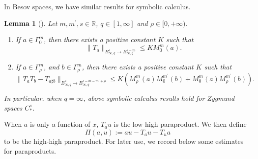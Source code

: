\documentclass[10pt]{amsart}
\newtheorem{lemma}[theorem]{Lemma}
\theoremstyle{remark}
\theoremstyle{definition}
\numberwithin{equation}{section}
\begin{document}
In Besov spaces, we have similar results for symbolic calculus.
\begin{lemma}[\hspace{1sp}\cite{MR3585049}]
Let $m, m^{'}, s\in \mathbb{R}$, $q\in [1,\infty]$ and $\rho\in [0, + \infty)$.
\begin{enumerate}
\item If $a\in \Gamma^m_0$, then there exists a positive constant $K$ such that
\begin{equation*}
\|T_a\|_{B^s_{\infty, q}\rightarrow B^{s-m}_{\infty, q}} \leq KM^m_0(a).
\end{equation*}
\item If $a\in \Gamma^m_\rho$, and $b\in \Gamma^m_\rho$, then there exists a positive constant $K$ such that
\begin{equation}
  \|T_a T_b-T_{a \sharp b} \|_{B^s_{\infty, q} \rightarrow B^{s-m-m^{'}+\rho}_{\infty, q}} \leq K\left(M^m_\rho(a)M^{m^{'}}_0(b) + M^m_0(a)M^{m^{'}}_\rho(b)\right). \label{CompositionTwo}
\end{equation}
\end{enumerate}
In particular, when $q = \infty$, above symbolic calculus results hold for Zygmund spaces $C^s_{*}$.
\end{lemma}

When $a$ is only a function of $x$, $T_a u$ is the low high paraproduct.
We then define 
\begin{equation*}
\Pi(a, u) := au -T_a u -T_u a
\end{equation*}
to be the high-high paraproduct.
For later use, we record below some estimates for paraproducts.
\end{document}
